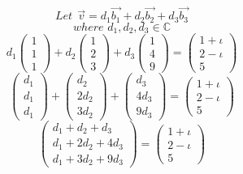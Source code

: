 \documentclass{article}
\begin{document}
\begin{equation}
	Let\ \  \vec{v} = d_1 \vec{b_1} + d_2 \vec{b_2} + d_3 \vec{b_3}
\end{equation}
\begin{equation}
where \, \, d_1, d_2, d_3 \in \mathbb{C}
\end{equation}
\begin{equation}
	d_1 
	\begin{pmatrix}
	1 \\ 1 \\ 1 
	\end{pmatrix}
	+ d_2 
	\begin{pmatrix}
	1 \\ 2 \\ 3
	\end{pmatrix}		
	+ d_3 
	\begin{pmatrix}
	1 \\ 4 \\ 9
\end{pmatrix}		
	= 
	\begin{pmatrix}
		1+ \iota \\ 2 - \iota \\ 5
	\end{pmatrix}
\end{equation}
\begin{equation}
	\begin{pmatrix}
	d_1 \\ d_1 \\ d_1
	\end{pmatrix}
	+
	\begin{pmatrix}
	d_2 \\ 2d_2 \\ 3d_2
	\end{pmatrix}
	+
	\begin{pmatrix}
	d_3 \\ 4 d_3 \\ 9 d_3
	\end{pmatrix}
	= 
	\begin{pmatrix}
		1+ \iota \\ 2 - \iota \\ 5
	\end{pmatrix}
\end{equation}
\begin{equation}
\begin{pmatrix}
	d_1 + d_2 + d_3 \\ d_1 + 2 d_2 + 4 d_3 \\ d_1 + 3 d_2 + 9 d_3
\end{pmatrix}		
	= 
	\begin{pmatrix}
		1+ \iota \\ 2 - \iota \\ 5
	\end{pmatrix}
\end{equation}
\end{document}
